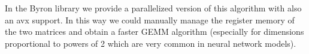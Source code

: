 \documentclass{standalone}
\begin{document}
In the \textsf{Byron} library we provide a parallelized version of this algorithm with also an \textsf{avx} support.
In this way we could manually manage the register memory of the two matrices and obtain a faster \textsf{GEMM} algorithm (especially for dimensions proportional to powers of 2 which are very common in neural network models).
\end{document}
